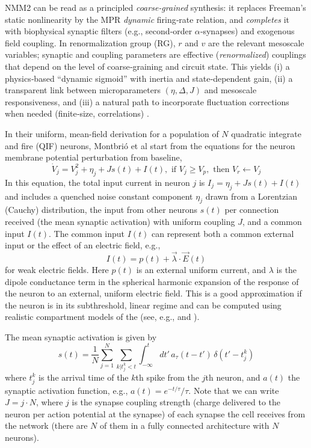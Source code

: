 \documentclass[12pt]{article}
\numberwithin{equation}{section}
\begin{document}
 
NMM2 can be read as a principled \emph{coarse‑grained} synthesis: it replaces Freeman’s static nonlinearity by the MPR \emph{dynamic} firing‑rate relation, and \emph{completes} it with biophysical synaptic filters (e.g., second‑order $\alpha$‑synapses) and exogenous field coupling. In renormalization group (RG), $r$ and $v$ are the relevant mesoscale variables; synaptic and coupling parameters are effective (\emph{renormalized}) couplings that depend on the level of coarse‑graining and circuit state. This yields (i) a physics‑based “dynamic sigmoid” with inertia and state‑dependent gain, (ii) a transparent link between microparameters $(\eta,\Delta,J)$ and mesoscale responsiveness, and (iii) a natural path to incorporate fluctuation corrections when needed (finite‑size, correlations) \cite{buiceSystematicFluctuationExpansion2010}.  %


In their uniform,  mean-field derivation for a population of $N$  quadratic integrate and fire (QIF) neurons, Montbri\'o et al \cite{Montbrio:2015aa}  start from the equations  for the neuron membrane potential perturbation from baseline,
\begin{equation} \label{eq:qif}
\dot V_j = V_j^2 + \eta_j + J s(t) + I(t), \mbox{ if } V_j \ge V_p, \mbox{ then } V_r \leftarrow V_j
\end{equation}
In this equation, the total input current in neuron $j$ is  $I_j =  \eta_j + J s(t) + I(t)$ and includes a quenched noise constant component $\eta_j$ drawn from a Lorentzian (Cauchy) distribution, the input from other neurons $s(t)$ per connection received (the mean synaptic activation) with uniform coupling $J$, and a common input $I(t)$. The common input $I(t)$ can  represent both a common external input or the effect of an electric field, e.g.,
\begin{equation}
 I(t) =  p(t) + \vec \lambda \cdot \vec E(t)   
\end{equation}
for weak electric fields.
Here $p(t)$ is an external uniform current, and $\lambda$ is the dipole conductance term in the spherical harmonic expansion of the response of the neuron to an external, uniform electric field.   This is a good approximation if the neuron is in its subthreshold, linear regime and can be computed using realistic compartment models of the  (see, e.g., \cite{aberra_biophysically_2018} and \cite{Galan:2021aa}). 

The mean synaptic activation is given by
\begin{equation}
    s(t) = \frac{1}{N}\sum_{j=1}^N \sum_{k | t^k_j < t} \int_{-\infty}^t dt' \, a_\tau(t-t') \, \delta(t'-t^k_j)
\end{equation}
where  $t^k_j$ is  the arrival time of the $k$th spike from the $j$th neuron, and  $a(t)$ the synaptic activation function, e.g., $a(t) = e^{-t/\tau}/\tau$.  Note that we can write $J=j\cdot N$, where $j$ is the synapse coupling strength (charge delivered to the neuron per action potential at the synapse) of each synapse the cell receives from the network (there are $N$ of them in a fully connected architecture with $N$ neurons). 
\end{document}
